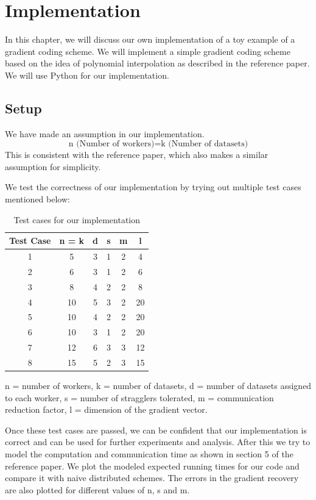 \documentclass{report}
\theoremstyle{definition}
\begin{document}
\chapter{Implementation}
In this chapter, we will discuss our own implementation of a toy example of a gradient coding scheme. We will implement a simple gradient coding scheme based on the idea of polynomial interpolation as described in the reference paper. We will use Python for our implementation.
\section{Setup}
We have made an assumption in our implementation.
\begin{equation*}
    \text{n (Number of workers)} = \text{k (Number of datasets)}
\end{equation*}
This is consistent with the reference paper, which also makes a similar assumption for simplicity. 

We test the correctness of our implementation by trying out multiple test cases mentioned below:
\begin{table}[!h]
    \centering
\begin{tabular}{c|c|c|c|c|c}
\hline
\textbf{Test Case} & \textbf{n = k} & \textbf{d} & \textbf{s} & \textbf{m} & \textbf{l} \\ \hline
1 & 5 & 3 & 1 & 2 & 4 \\
2 & 6 & 3 & 1 & 2 & 6 \\
3 & 8 & 4 & 2 & 2 & 8 \\
4 & 10 & 5 & 3 & 2 & 20 \\
5 & 10 & 4 & 2 & 2 & 20 \\
6 & 10 & 3 & 1 & 2 & 20 \\
7 & 12 & 6 & 3 & 3 & 12 \\
8 & 15 & 5 & 2 & 3 & 15 \\ 
\hline
\end{tabular}
\caption{Test cases for our implementation}
\end{table}

n = number of workers, k = number of datasets, d = number of datasets assigned to each worker, s = number of stragglers tolerated, m = communication reduction factor, l = dimension of the gradient vector.

Once these test cases are passed, we can be confident that our implementation is correct and can be used for further experiments and analysis. After this we try to model the computation and communication time as shown in section 5 of the reference paper. We plot the modeled expected running times for our code and compare it with naive distributed schemes. The errors in the gradient recovery are also plotted for different values of n, s and m. 
\end{document}
